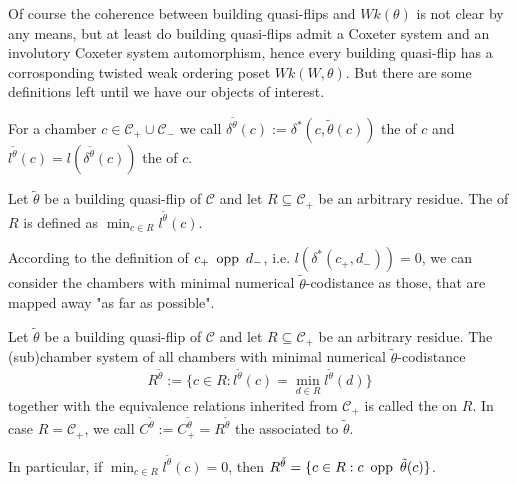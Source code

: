 Of course the coherence between building quasi-flips and $Wk(\theta)$ is not clear by any means, but at least do building quasi-flips admit a Coxeter system and an involutory Coxeter system automorphism, hence every building quasi-flip has a corrosponding twisted weak ordering poset $Wk(W,\theta)$. But there are some definitions left until we have our objects of interest.

\begin{defi}
	For a chamber $c \in \mathcal C_+ \cup \mathcal C_-$ we call $\delta^{\tilde \theta}(c) := \delta^*(c,\tilde \theta(c))$ the  of $c$ and $l^{\tilde \theta}(c) = l(\delta^{\tilde \theta}(c))$ the  of $c$.
\end{defi}

\begin{defi}
	Let $\tilde \theta$ be a building quasi-flip of $\mathcal C$ and let $R \subseteq \mathcal C_+$ be an arbitrary residue. The  of $R$ is defined as $\min_{c \in R} l^{\tilde \theta}(c)$.
\end{defi}

According to the definition of $c_+ \opp d_-$, i.e. $l(\delta^*(c_+,d_-)) = 0$, we can consider the chambers with minimal numerical $\tilde \theta$-codistance as those, that are mapped away "as far as possible".

\begin{defi}
	Let $\tilde \theta$ be a building quasi-flip of $\mathcal C$ and let $R \subseteq \mathcal C_+$ be an arbitrary residue. The (sub)chamber system of all chambers with minimal numerical $\tilde \theta$-codistance
	$$ R^{\tilde \theta} := \{ c \in R : l^{\tilde \theta}(c) = \min_{d \in R} l^{\tilde \theta}(d) \} $$
	together with the equivalence relations inherited from $\mathcal C_+$ is called the  on $R$. In case $R = \mathcal C_+$, we call $C^{\tilde \theta} := C_+^{\tilde \theta} = R^{\tilde \theta}$ the  associated to $\tilde \theta$.
\end{defi}

In particular, if $\min_{c \in R} l^{\tilde \theta}(c) = 0$, then $R^{\tilde \theta} = \{ c \in R : c \opp \tilde \theta(c) \}$.